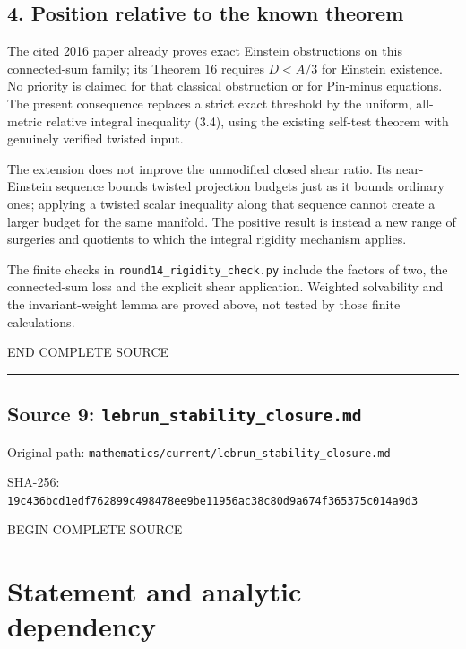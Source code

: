 \documentclass[
  10pt,
]{article}
\begin{document}
\hypertarget{position-relative-to-the-known-theorem}{%
\subsection{4. Position relative to the known
theorem}\label{position-relative-to-the-known-theorem}}

The cited 2016 paper already proves exact Einstein obstructions on this
connected-sum family; its Theorem 16 requires \(D<A/3\) for Einstein
existence. No priority is claimed for that classical obstruction or for
Pin-minus equations. The present consequence replaces a strict exact
threshold by the uniform, all-metric relative integral inequality (3.4),
using the existing self-test theorem with genuinely verified twisted
input.

The extension does not improve the unmodified closed shear ratio. Its
near-Einstein sequence bounds twisted projection budgets just as it
bounds ordinary ones; applying a twisted scalar inequality along that
sequence cannot create a larger budget for the same manifold. The
positive result is instead a new range of surgeries and quotients to
which the integral rigidity mechanism applies.

The finite checks in \nolinkurl{round14_rigidity_check.py} include the
factors of two, the connected-sum loss and the explicit shear
application. Weighted solvability and the invariant-weight lemma are
proved above, not tested by those finite calculations.

END COMPLETE SOURCE

\begin{center}\rule{0.5\linewidth}{0.5pt}\end{center}

\hypertarget{source-9-lebrun_stability_closure.md}{%
\subsection{Source 9:
\nolinkurl{lebrun_stability_closure.md}}\label{source-9-lebrun_stability_closure.md}}

Original path:
\nolinkurl{mathematics/current/lebrun_stability_closure.md}

SHA-256:
\nolinkurl{19c436bcd1edf762899c498478ee9be11956ac38c80d9a674f365375c014a9d3}

BEGIN COMPLETE SOURCE

\hypertarget{statement-and-analytic-dependency}{%
\section{Statement and analytic
dependency}\label{statement-and-analytic-dependency}}
\end{document}
